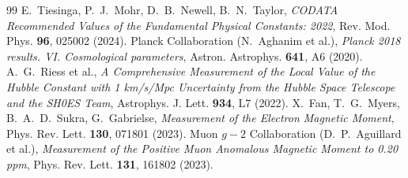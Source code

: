 \documentclass[11pt,a4paper]{article}
\theoremstyle{definition}
\theoremstyle{remark}
\numberwithin{equation}{section}
\begin{document}
\begin{thebibliography}{99}
 E.~Tiesinga, P.~J.~Mohr, D.~B.~Newell, B.~N.~Taylor, \emph{CODATA Recommended Values of the Fundamental Physical Constants: 2022}, Rev. Mod. Phys. \textbf{96}, 025002 (2024).
 Planck Collaboration (N.~Aghanim et al.), \emph{Planck 2018 results. VI. Cosmological parameters}, Astron. Astrophys. \textbf{641}, A6 (2020).
 A.~G.~Riess et al., \emph{A Comprehensive Measurement of the Local Value of the Hubble Constant with 1 km/s/Mpc Uncertainty from the Hubble Space Telescope and the SH0ES Team}, Astrophys. J. Lett. \textbf{934}, L7 (2022).
 X.~Fan, T.~G.~Myers, B.~A.~D.~Sukra, G.~Gabrielse, \emph{Measurement of the Electron Magnetic Moment}, Phys. Rev. Lett. \textbf{130}, 071801 (2023).
 Muon $g-2$ Collaboration (D.~P.~Aguillard et al.), \emph{Measurement of the Positive Muon Anomalous Magnetic Moment to 0.20 ppm}, Phys. Rev. Lett. \textbf{131}, 161802 (2023).
\end{thebibliography}
\end{document}
